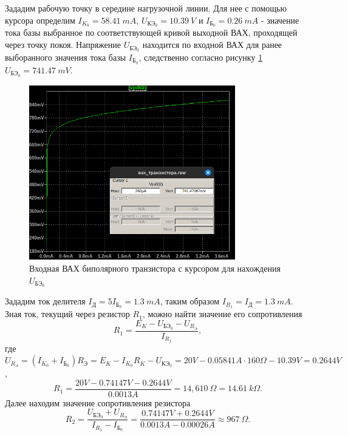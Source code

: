 Зададим рабочую точку в середине нагрузочной линии. Для нее с помощью курсора
определим $I_{K_0}=58.41\ mA$, $U_{\text{КЭ}_0}=10.39\ V$ и $I_{\text{Б}_0}=0.26\ mA$ - значение
тока базы выбранное по соответствующей кривой выходной ВАХ, проходящей через
точку покоя. Напряжение $U_{\text{БЭ}_0}$ находится по входной ВАХ для ранее 
выборанного значения тока базы $I_{\text{Б}_0}$, следственно согласно рисунку \ref{fig:вахвходноедлярабточки}
$U_{\text{БЭ}_0}=741.47\ mV$.
\begin{figure}[H]
    \centering
    \includegraphics[width=0.8\textwidth]{figs/вахвходноедлярабточки.png}
    \caption{Входная ВАХ биполярного транзистора с курсором для нахождения $U_{\text{БЭ}_0}$}
    \label{fig:вахвходноедлярабточки}
\end{figure}

Зададим ток делителя $I_\text{Д}=5I_{\text{Б}_0}=1.3\ mA$, таким образом $I_{R_1}=I_\text{Д}=1.3\ mA$.
Зная ток, текущий через резистор $R_1$, можно найти значение его сопротивления
\begin{equation*}
    R_1=\frac{E_K-U_{\text{БЭ}_0}-U_{R_\text{Э}}}{I_{R_1}},
\end{equation*}
где $U_{R_\text{Э}}=(I_{K_0} + I_{\text{Б}_0})R_\text{Э}=E_K-I_{K_0}R_K-U_{\text{КЭ}_0}=20V-0.05841A\cdot 160\Omega-10.39V=0.2644V$,
\begin{equation*}
    R_1=\frac{20V-0.74147V-0.2644V}{0.0013A}=14,610\ \Omega= 14.61\ k\Omega.
\end{equation*}
Далее находим значение сопротивления резистора
\begin{equation*}
    R_2=\frac{U_{\text{БЭ}_0}+U_{R_\text{Э}}}{I_{R_1}-I_{\text{Б}_0}}=\frac{0.74147V+0.2644V}{0.0013A-0.00026A}\approx 967\ \Omega.
\end{equation*}

